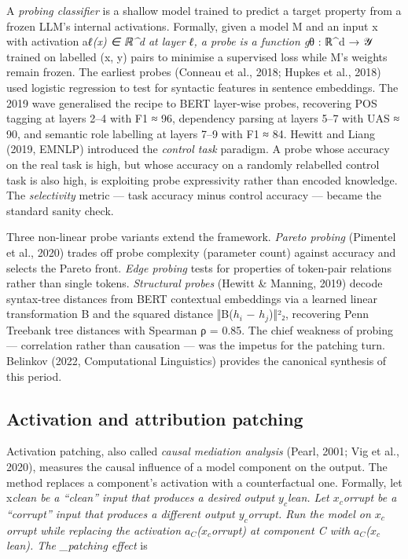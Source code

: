 \documentclass{article}
\begin{document}
A \emph{probing classifier} is a shallow model trained to predict a target property from a frozen LLM's internal activations. Formally, given a model M and an input x with activation a\emph{ℓ(x) ∈ ℝ\^{}d at layer ℓ, a probe is a function g}θ : ℝ\^{}d → 𝒴 trained on labelled (x, y) pairs to minimise a supervised loss while M's weights remain frozen. The earliest probes (Conneau et al., 2018; Hupkes et al., 2018) used logistic regression to test for syntactic features in sentence embeddings. The 2019 wave \citep{tenney2019bertrediscoversthe} generalised the recipe to BERT layer-wise probes, recovering POS tagging at layers 2--4 with F1 ≈ 96, dependency parsing at layers 5--7 with UAS ≈ 90, and semantic role labelling at layers 7--9 with F1 ≈ 84. Hewitt and Liang (2019, EMNLP) introduced the \emph{control task} paradigm. A probe whose accuracy on the real task is high, but whose accuracy on a randomly relabelled control task is also high, is exploiting probe expressivity rather than encoded knowledge. The \emph{selectivity} metric --- task accuracy minus control accuracy --- became the standard sanity check.

Three non-linear probe variants extend the framework. \emph{Pareto probing} (Pimentel et al., 2020) trades off probe complexity (parameter count) against accuracy and selects the Pareto front. \emph{Edge probing} \citep{tenney2019bertrediscoversthe} tests for properties of token-pair relations rather than single tokens. \emph{Structural probes} (Hewitt \& Manning, 2019) decode syntax-tree distances from BERT contextual embeddings via a learned linear transformation B and the squared distance ‖B(\(h_i\) − \(h_j\))‖²₂, recovering Penn Treebank tree distances with Spearman ρ = 0.85. The chief weakness of probing --- correlation rather than causation --- was the impetus for the patching turn. Belinkov (2022, Computational Linguistics) provides the canonical synthesis of this period.

\subsection{Activation and attribution patching}\label{activation-and-attribution-patching}

Activation patching, also called \emph{causal mediation analysis} (Pearl, 2001; Vig et al., 2020), measures the causal influence of a model component on the output. The method replaces a component's activation with a counterfactual one. Formally, let x\emph{clean be a ``clean'' input that produces a desired output \(y_c\)lean. Let \(x_c\)orrupt be a ``corrupt'' input that produces a different output \(y_c\)orrupt. Run the model on \(x_c\)orrupt while replacing the activation \(a_C\)(\(x_c\)orrupt) at component C with \(a_C\)(\(x_c\)lean). The \_patching effect} is
\end{document}
